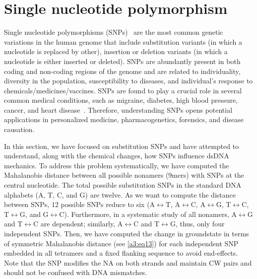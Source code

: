 \section{Single nucleotide polymorphism}\label{c4:s7}
Single nucleotide polymorphisms (SNPs)~\cite{botstein1980construction} are the most common genetic variations in the human genome that include substitution variants (in which a nucleotide is replaced by other), insertion or deletion variants (in which a nucleotide is either inserted or deleted).
SNPs are abundantly present in both coding and non-coding regions of the genome and are related to individuality, diversity in the population, susceptibility to diseases, and individual's response to chemicals/medicines/vaccines.
SNPs are found to play a crucial role in several common medical conditions, such as migraine, diabetes, high blood pressure, cancer, and heart disease~\cite{shastry2002snp}. 
Therefore, understanding SNPs opens potential applications in personalized medicine, pharmacogenetics, forensics, and disease causation.

In this section, we have focused on substitution SNPs and have attempted to understand, along with the chemical changes, how SNPs influence dsDNA mechanics. 
To address this problem systematically, we have computed the Mahalanobis distance between all possible nonamers (9mers) with SNPs at the central nucleotide.
The total possible substitution SNPs in the standard DNA alphabets (A, T, C, and G) are twelve.
As we want to compute the distance between SNPs, 12 possible SNPs reduce to six (A$\longleftrightarrow$T, A$\longleftrightarrow$C, A$\longleftrightarrow$G, T$\longleftrightarrow$C, T$\longleftrightarrow$G, and G$\longleftrightarrow$C).
Furthermore, in a systematic study of all nonamers, A$\longleftrightarrow$G and T$\longleftrightarrow$C are dependent; similarly, A$\longleftrightarrow$C and T$\longleftrightarrow$G, thus, only four independent SNPs.
Then, we have computed the change in groundstate in terms of symmetric Mahalanobis distance (see \cref{a3:eq13}) for each independent SNP embedded in all tetramers and a fixed flanking sequence to avoid end-effects.
Note that the SNP modifies the NA on both strands  and maintain CW pairs and should not be confused with DNA mismatches.


